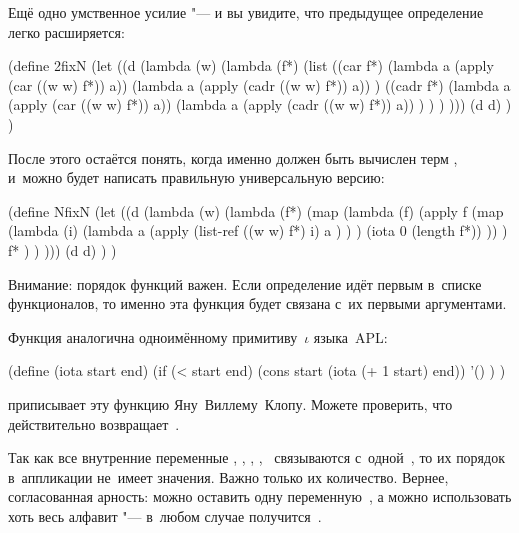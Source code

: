 
Ещё одно умственное усилие "--- и вы увидите, что предыдущее определение
 легко расширяется:

\begin{code:lisp}
(define 2fixN
  (let ((d (lambda (w)
             (lambda (f*)
               (list ((car f*)
                      (lambda a (apply (car ((w w) f*)) a))
                      (lambda a (apply (cadr ((w w) f*)) a)) )
                     ((cadr f*)
                      (lambda a (apply (car ((w w) f*)) a))
                      (lambda a (apply (cadr ((w w) f*)) a)) ) ) ) )))
    (d d) ) )
\end{code:lisp}

После этого остаётся понять, когда именно должен быть вычислен терм
, и~можно будет написать правильную универсальную версию:

\begin{code:lisp}
(define NfixN
  (let ((d (lambda (w)
             (lambda (f*)
               (map (lambda (f)
                      (apply f (map (lambda (i)
                                      (lambda a
                                        (apply (list-ref ((w w) f*) i)
                                               a ) ) )
                                    (iota 0 (length f*)) )) )
                    f* ) ) )))
    (d d) ) )
\end{code:lisp}

Внимание: порядок функций важен. Если определение  идёт первым в~списке
функционалов, то именно эта функция будет связана с~их первыми аргументами.

Функция  аналогична одноимённому примитиву~$\iota$ языка~APL:

\begin{code:lisp}
(define (iota start end)
  (if (< start end)
      (cons start (iota (+ 1 start) end))
      '() ) )
\end{code:lisp}



\cite{bar84} приписывает эту функцию Яну~Виллему~Клопу. Можете проверить, что
 действительно возвращает~.

Так как все внутренние переменные , , , ,~
связываются с~одной~, то их порядок в~аппликации 
не~имеет значения. Важно только их количество. Вернее, согласованная арность:
можно оставить одну переменную~, а можно использовать хоть весь алфавит
"--- в~любом случае получится~\!.



